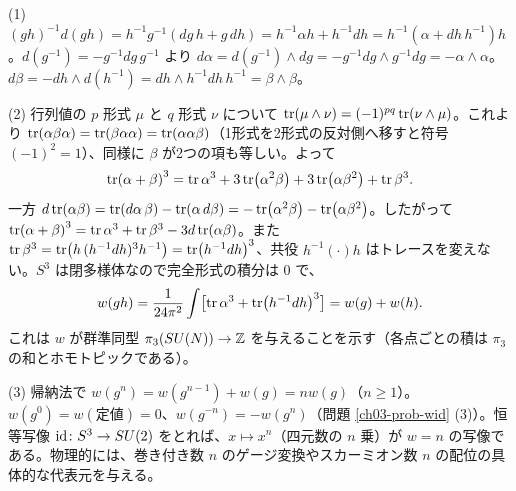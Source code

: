 \begin{solution}
(1) $(gh)^{-1}d(gh)=h^{-1}g^{-1}(dg\,h+g\,dh)=h^{-1}\alpha h+h^{-1}dh=h^{-1}(\alpha+dh\,h^{-1})h$。$d(g^{-1})=-g^{-1}dg\,g^{-1}$ より $d\alpha=d(g^{-1})\wedge dg=-g^{-1}dg\wedge g^{-1}dg=-\alpha\wedge\alpha$。$d\beta=-dh\wedge d(h^{-1})=dh\wedge h^{-1}dh\,h^{-1}=\beta\wedge\beta$。

(2) 行列値の $p$ 形式 $\mu$ と $q$ 形式 $\nu$ について $\tr(\mu\wedge\nu)=(-1)^{pq}\tr(\nu\wedge\mu)$。これより $\tr(\alpha\beta\alpha)=\tr(\beta\alpha\alpha)=\tr(\alpha\alpha\beta)$（1形式を2形式の反対側へ移すと符号 $(-1)^2=1$）、同様に $\beta$ が2つの項も等しい。よって
\[
\tr(\alpha+\beta)^3=\tr\alpha^3+3\tr(\alpha^2\beta)+3\tr(\alpha\beta^2)+\tr\beta^3 .
\]
一方 $d\tr(\alpha\beta)=\tr(d\alpha\,\beta)-\tr(\alpha\,d\beta)=-\tr(\alpha^2\beta)-\tr(\alpha\beta^2)$。したがって $\tr(\alpha+\beta)^3=\tr\alpha^3+\tr\beta^3-3d\tr(\alpha\beta)$。また $\tr\beta^3=\tr(h\,(h^{-1}dh)^3h^{-1})=\tr(h^{-1}dh)^3$、共役 $h^{-1}(\cdot)h$ はトレースを変えない。$S^3$ は閉多様体なので完全形式の積分は $0$ で、
\[
w(gh)=\frac{1}{24\pi^2}\int\bigl[\tr\alpha^3+\tr(h^{-1}dh)^3\bigr]=w(g)+w(h).
\]
これは $w$ が群準同型 $\pi_3(SU(N))\to\mathbb{Z}$ を与えることを示す（各点ごとの積は $\pi_3$ の和とホモトピックである）。

(3) 帰納法で $w(g^n)=w(g^{n-1})+w(g)=nw(g)$（$n\ge1$）。$w(g^0)=w(\text{定値})=0$、$w(g^{-n})=-w(g^n)$（問題 \ref{ch03-prob-wid} (3)）。恒等写像 $\mathrm{id}\colon S^3\to SU(2)$ をとれば、$x\mapsto x^n$（四元数の $n$ 乗）が $w=n$ の写像である。物理的には、巻き付き数 $n$ のゲージ変換やスカーミオン数 $n$ の配位の具体的な代表元を与える。
\end{solution}

